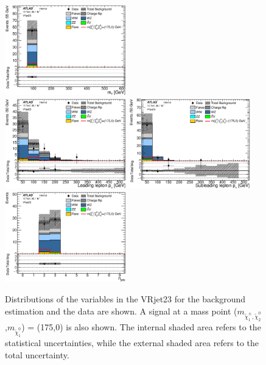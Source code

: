 \begin{figure}[htbp]
\includegraphics[width=0.47\textwidth]{data/plot/VR/all_Mt_VRjet23.eps} \\
\includegraphics[width=0.47\textwidth]{data/plot/VR/all_PtLep_VRjet23.eps}
\includegraphics[width=0.47\textwidth]{data/plot/VR/all_PtSublep_VRjet23.eps} \\
\includegraphics[width=0.47\textwidth]{data/plot/VR/all_Njets_VRjet23.eps}
\caption{Distributions of the variables in the VRjet23 for the background estimation and the data are shown. A signal at a mass point ($m_{\tilde{\chi}_1^\pm , \tilde{\chi}_2^0}$,$m_{\tilde{\chi}_1^0}$) = (175,0) is also shown. The internal shaded area refers to the statistical uncertainties, while the external shaded area refers to the total uncertainty.}
\label{fig:VRjet23_plot}
\end{figure}
